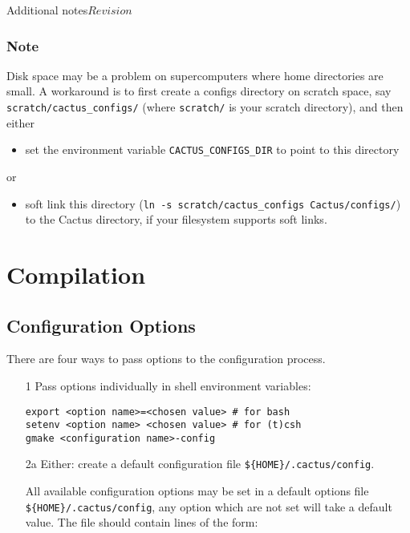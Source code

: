\begin{cactuspart}{Additional notes}{}{$Revision$}
\subsection{Note}
Disk space may be a problem on supercomputers where home directories are small.
A workaround is to first create a
configs directory on scratch space, say \texttt{scratch/cactus\_configs/} (where
\texttt{scratch/} is your scratch directory), and then either
\begin{itemize}
\item{} set the environment variable \texttt{CACTUS\_CONFIGS\_DIR} to point to
this directory
\end{itemize}
or
\begin{itemize}
\item{}  soft link this directory (\texttt{ln -s
scratch/cactus\_configs Cactus/configs/}) to the Cactus directory, if your
filesystem supports soft links.
\end{itemize}


\chapter{Compilation}


\section{Configuration Options}
\label{sec:confopts}

There are four ways to pass options to the configuration process.
\begin{enumerate}
  \item[1]{}
    Pass options individually in shell environment variables:

    {\tt export <option name>=<chosen value>    \# for bash}\\
    {\tt setenv <option name> <chosen value>    \# for (t)csh}\\
    {\tt gmake <configuration name>-config}

  \item[2a]{}
    Either: create a default configuration file \texttt{\$\{HOME\}/.cactus/config}.

    All available configuration options may be set in a default options file
    \texttt{\$\{HOME\}/.cactus/config}, any option which are not set will take a
    default value. The file should contain lines of the form:


\end{enumerate}
\end{cactuspart}
